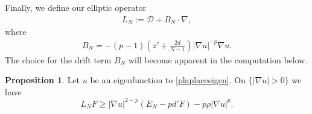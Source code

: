 \documentclass[11pt]{amsart}
\theoremstyle{definition}
\newtheorem{proposition}[theorem]{Proposition}
\begin{document}
Finally, we define our elliptic operator
\begin{align*}
    L_N:=\mathcal{D}+B_N\cdot \nabla ,
\end{align*}
where
\begin{align*}
    B_N=-(p-1)(z'+\frac{2d}{N-1})|\nabla u|^{-p}\nabla u.
\end{align*}
The choice for the drift term $B_N$ will become apparent in the computation below.
\begin{proposition}
Let $u$ be an eigenfunction to \eqref{plaplaceeigen}.  On $\{|\nabla u|>0\}$ we have
    \begin{equation}\label{subineq}
    L_NF \geq |\nabla u|^{2-p}(E_N-pd'F)-p\rho|\nabla u|^p.
\end{equation}
\end{proposition}
\end{document}
